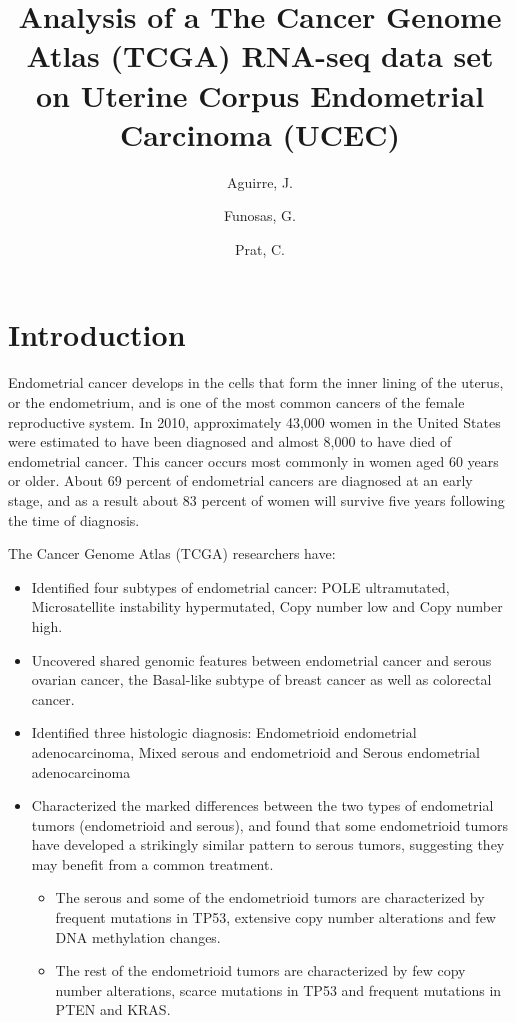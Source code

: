 \documentclass[9pt,twocolumn,twoside]{gsajnl}
\title{Analysis of a The Cancer Genome Atlas (TCGA) RNA-seq data set on Uterine Corpus Endometrial Carcinoma (UCEC)}
\author[$\ast$]{Aguirre, J.}
\author[$\ast$]{Funosas, G.}
\author[$\ast$,1]{Prat, C.}
\affil[$\ast$]{University Pompeu Fabra}
\begin{document}
\maketitle
\thispagestyle{firststyle}
\marginmark
\firstpagefootnote
{}
\vspace{-11pt}%


\section*{Introduction}

Endometrial cancer develops in the cells that form the inner lining of the uterus, or the endometrium, and is one of the most common cancers of the female reproductive system. In 2010, approximately 43,000 women in the United States were estimated to have been diagnosed and almost 8,000 to have died of endometrial cancer. This cancer occurs most commonly in women aged 60 years or older. About 69 percent of endometrial cancers are diagnosed at an early stage, and as a result about 83 percent of women will survive five years following the time of diagnosis.

The Cancer Genome Atlas (TCGA) \citep{TheCancerGenomeAtlas} researchers have: 
\begin{itemize}
\item Identified four subtypes of endometrial cancer: POLE ultramutated, Microsatellite instability hypermutated, Copy number low and Copy number high.
\item Uncovered shared genomic features between endometrial cancer and serous ovarian cancer, the Basal-like subtype of breast cancer as well as colorectal cancer.
\item Identified three histologic diagnosis: Endometrioid endometrial adenocarcinoma, Mixed serous and endometrioid and Serous endometrial adenocarcinoma
\item Characterized the marked differences between the two types of endometrial tumors (endometrioid and serous), and found that some endometrioid tumors have developed a strikingly similar pattern to serous tumors, suggesting they may benefit from a common treatment.
\begin{itemize}
\item The serous and some of the endometrioid tumors are characterized by frequent mutations in TP53, extensive copy number alterations and few DNA methylation changes.
\item The rest of the endometrioid tumors are characterized by few copy number alterations, scarce mutations in TP53 and frequent mutations in PTEN and KRAS.
\end{itemize}
\end{itemize}
\end{document}
